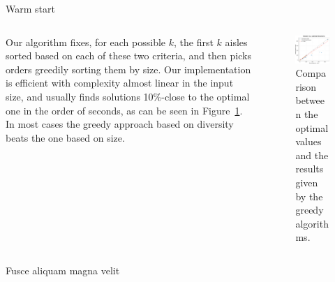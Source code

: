 \documentclass[final]{beamer}
\newlength{\colwidth}
\begin{document}
\begin{frame}[t]
\begin{columns}[t]
\begin{column}{\colwidth}
\begin{block}{Warm start}
    \begin{columns}
  \begin{column}{0.45\textwidth}
  \justify
  Our algorithm fixes, for each possible $k$, the first $k$ aisles sorted based on each of these two criteria, and then picks orders greedily sorting them by size. Our implementation is efficient with complexity almost linear in the input size,
    and usually finds solutions 10\%-close to the optimal one in the order of seconds, as can be seen in Figure~\ref{fig:greedy_vs_optimal}. In most cases the greedy approach based on diversity beats the one based on size.
  \end{column}
  \begin{column}{0.55\textwidth}  %
  \begin{center}
        \begin{figure}
        \includegraphics{greedy_vs_optimal.pdf}
        \caption{Comparison between the optimal values and the results given by the greedy algorithms.}
        \label{fig:greedy_vs_optimal}
      \end{figure}
    \end{center}
     \end{column}
  \end{columns}


    
  \end{block}

  \begin{block}{Fusce aliquam magna velit}


\end{block}
\end{column}
\end{columns}
\end{frame}
\end{document}
